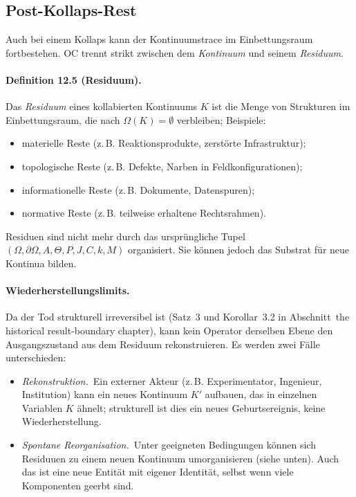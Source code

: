 \subsection{Post-Kollaps-Rest}

Auch bei einem Kollaps kann der Kontinuumstrace im Einbettungsraum fortbestehen.
OC trennt strikt zwischen dem \emph{Kontinuum} und seinem
\emph{Residuum}.

\paragraph{Definition 12.5 (Residuum).}
Das \emph{Residuum} eines kollabierten Kontinuums \(K\) ist die Menge von
Strukturen im Einbettungsraum, die nach \(\Omega(K)=\emptyset\) verbleiben; Beispiele:
\begin{itemize}
  \item materielle Reste (z.\,B. Reaktionsprodukte, zerstörte Infrastruktur);
  \item topologische Reste (z.\,B. Defekte, Narben in Feldkonfigurationen);
  \item informationelle Reste (z.\,B. Dokumente, Datenspuren);
  \item normative Reste (z.\,B. teilweise erhaltene Rechtsrahmen).
\end{itemize}

Residuen sind nicht mehr durch das ursprüngliche Tupel
\((\Omega,\partial\Omega,A,\Theta,P,J,C,k,M)\) organisiert. Sie können jedoch das
Substrat für neue Kontinua bilden.

\paragraph{Wiederherstellungslimits.}
Da der Tod strukturell irreversibel ist (Satz~3 und Korollar~3.2 in
Abschnitt~the historical result-boundary chapter), kann kein Operator derselben Ebene den
Ausgangszustand aus dem Residuum rekonstruieren. Es werden zwei Fälle
unterschieden:
\begin{itemize}
  \item \emph{Rekonstruktion.}\
        Ein externer Akteur (z.\,B. Experimentator, Ingenieur, Institution)
        kann ein neues Kontinuum \(K'\) aufbauen, das in einzelnen Variablen
        \(K\) ähnelt; strukturell ist dies ein neues Geburtsereignis, keine
        Wiederherstellung.
  \item \emph{Spontane Reorganisation.}\
        Unter geeigneten Bedingungen können sich Residuuen zu einem neuen
        Kontinuum umorganisieren (siehe unten). Auch das ist eine neue
        Entität mit eigener Identität, selbst wenn viele Komponenten geerbt sind.
\end{itemize}

